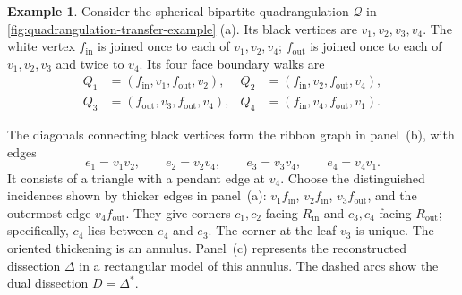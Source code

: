 \documentclass[11pt]{amsart}
\theoremstyle{definition}
\theoremstyle{plain}
\theoremstyle{definition}
\newtheorem{example}[example]{Example}
\theoremstyle{definition}
\begin{document}
\begin{example}
Consider the spherical bipartite quadrangulation $\mathcal Q$ in
\cref{fig:quadrangulation-transfer-example} (a).
Its black vertices are $v_1,v_2,v_3,v_4$. The white vertex
$f_{\mathrm{in}}$ is joined once to each of $v_1,v_2,v_4$;
$f_{\mathrm{out}}$ is joined once to each of $v_1,v_2,v_3$
and twice to $v_4$. Its four face boundary walks are
\[
\begin{aligned}
 Q_1&=(f_{\mathrm{in}},v_1,f_{\mathrm{out}},v_2),&
 Q_2&=(f_{\mathrm{in}},v_2,f_{\mathrm{out}},v_4),\\
 Q_3&=(f_{\mathrm{out}},v_3,f_{\mathrm{out}},v_4),&
 Q_4&=(f_{\mathrm{in}},v_4,f_{\mathrm{out}},v_1).
\end{aligned}
\]

The diagonals connecting black vertices form the ribbon graph in
panel~\textup{(b)}, with edges
\[
 e_1=v_1v_2,\qquad e_2=v_2v_4,\qquad
 e_3=v_3v_4,\qquad e_4=v_4v_1.
\]
It consists of a triangle with a pendant edge at $v_4$.
Choose the distinguished incidences shown by thicker edges in
panel~\textup{(a)}: $v_1f_{\mathrm{in}}$, $v_2f_{\mathrm{in}}$,
$v_3f_{\mathrm{out}}$, and the outermost edge $v_4f_{\mathrm{out}}$.
They give corners $c_1,c_2$ facing $R_{\mathrm{in}}$ and
$c_3,c_4$ facing $R_{\mathrm{out}}$; specifically, $c_4$ lies
between $e_4$ and $e_3$. The corner at the leaf $v_3$ is unique.
The oriented thickening is an annulus. Panel~\textup{(c)}
represents the reconstructed dissection $\Delta$ in a rectangular
model of this annulus.
The dashed arcs show the
dual dissection $D=\Delta^*$. %
\end{example}
\end{document}
